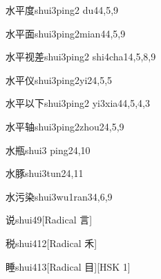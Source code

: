 \begin{entry}{水平度}{shui3ping2 du4}{4,5,9}
\end{entry}

\begin{entry}{水平面}{shui3ping2mian4}{4,5,9}
\end{entry}

\begin{entry}{水平视差}{shui3ping2 shi4cha1}{4,5,8,9}
\end{entry}

\begin{entry}{水平仪}{shui3ping2yi2}{4,5,5}
\end{entry}

\begin{entry}{水平以下}{shui3ping2 yi3xia4}{4,5,4,3}
\end{entry}

\begin{entry}{水平轴}{shui3ping2zhou2}{4,5,9}
\end{entry}

\begin{entry}{水瓶}{shui3 ping2}{4,10}
\end{entry}

\begin{entry}{水豚}{shui3tun2}{4,11}
\end{entry}

\begin{entry}{水污染}{shui3wu1ran3}{4,6,9}
\end{entry}

\begin{entry}{说}{shui4}{9}[Radical 言]
\end{entry}

\begin{entry}{税}{shui4}{12}[Radical 禾]
\end{entry}

\begin{entry}{睡}{shui4}{13}[Radical 目][HSK 1]
\end{entry}

